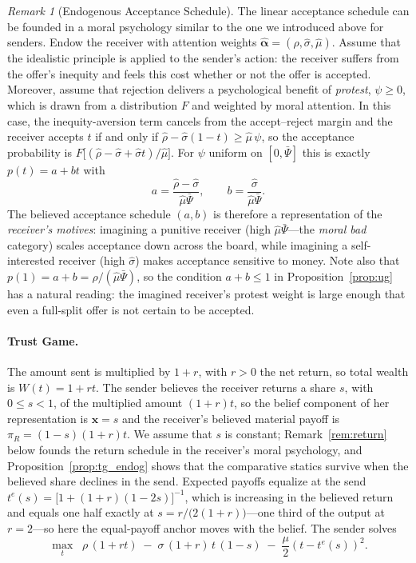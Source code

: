 \documentclass[11pt]{article}
\theoremstyle{plain}
\theoremstyle{remark}
\newtheorem{remark}{Remark}
\begin{document}
\begin{remark}[Endogenous Acceptance Schedule]
\label{rem:foundation}
The linear acceptance schedule can be founded in a moral psychology similar to the one we introduced above for senders. Endow the receiver with attention weights $\hat{\boldsymbol{\alpha}}=(\hat\rho,\hat\sigma,\hat\mu)$. Assume that the idealistic principle is applied to the sender's action: the receiver suffers from the offer's inequity and feels this cost whether or not the offer is accepted. Moreover, assume that rejection delivers a psychological benefit of \emph{protest}, $\psi\ge 0$, which is drawn from a distribution $F$ and weighted by moral attention. In this case, the inequity-aversion term cancels from the accept--reject margin and the receiver accepts $t$ if and only if $\hat\rho-\hat\sigma(1-t)\ge\hat\mu\,\psi$, so the acceptance probability is $F\bigl[(\hat\rho-\hat\sigma+\hat\sigma t)/\hat\mu\bigr]$. For $\psi$ uniform on $[0,\bar\Psi]$ this is exactly $p(t)=a+bt$ with
\begin{equation*}
a=\frac{\hat\rho-\hat\sigma}{\hat\mu\bar\Psi},\qquad b=\frac{\hat\sigma}{\hat\mu\bar\Psi}.
\end{equation*}
The believed acceptance schedule $(a,b)$ is therefore a representation of the \emph{receiver's motives}: imagining a punitive receiver (high $\hat\mu\bar\Psi$---the \emph{moral bad} category) scales acceptance down across the board, while imagining a self-interested receiver (high $\hat\sigma$) makes acceptance sensitive to money. Note also that $p(1)=a+b=\hat\rho/(\hat\mu\bar\Psi)$, so the condition $a+b\le 1$ in Proposition~\ref{prop:ug} has a natural reading: the imagined receiver's protest weight is large enough that even a full-split offer is not certain to be accepted.
\end{remark}

\paragraph{Trust Game.} The amount sent is multiplied by $1+r$, with $r>0$ the net return, so total wealth is $W(t)=1+rt$. The sender believes the receiver returns a share $s$, with $0\le s<1$, of the multiplied amount $(1+r)t$, so the belief component of her representation is $\mathbf{x}=s$ and the receiver's believed material payoff is $\pi_R=(1-s)(1+r)t$. We assume that $s$ is constant; Remark~\ref{rem:return} below founds the return schedule in the receiver's moral psychology, and Proposition~\ref{prop:tg_endog} shows that the comparative statics survive when the believed share declines in the send. Expected payoffs equalize at the send $t^{e}(s)=\bigl[1+(1+r)(1-2s)\bigr]^{-1}$, which is increasing in the believed return and equals one half exactly at $s=r/\bigl(2(1+r)\bigr)$---one third of the output at $r=2$---so here the equal-payoff anchor moves with the belief. The sender solves
\begin{equation}
\max_{t}\;\;\rho\,(1+rt)\;-\;\sigma\,(1+r)\,t\,(1-s)\;-\;\frac{\mu}{2}\left(t-t^{e}(s)\right)^{2}.
\label{eq:tg_objective}
\end{equation}
\end{document}
